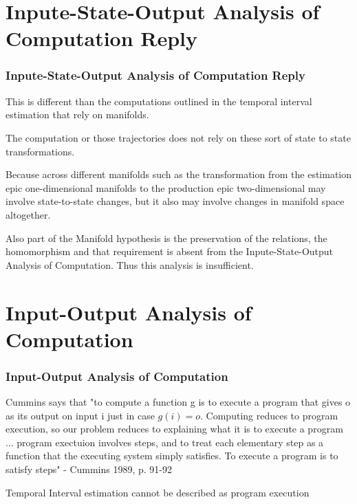\documentclass{beamer}
\begin{document}
\section{Inpute-State-Output Analysis of Computation Reply}
\begin{frame}
\frametitle{\textbf{Inpute-State-Output Analysis of Computation Reply} }

This is different than the computations outlined in the temporal interval estimation that rely on manifolds.

The computation or those trajectories does not rely on these sort of state to state transformations.

Because across different manifolds such as the transformation from the estimation epic one-dimensional manifolds to the production epic two-dimensional may involve state-to-state changes, but it also may involve changes in manifold space altogether.

Also part of the Manifold hypothesis is the preservation of the relations, the homomorphism and that requirement is absent from the Inpute-State-Output Analysis of Computation. Thus this analysis is insufficient.

\end{frame}


\section{Input-Output Analysis of Computation}
\begin{frame}
\frametitle{\textbf{Input-Output Analysis of Computation} }

Cummins says that "to compute a function g is to execute a program that gives o as its output on input i just in case $g(i) = o$. Computing reduces to program execution, so our problem reduces to explaining what it is to execute a program ... program exectuion involves steps, and to treat each elementary step as a function that the executing system simply satisfies. To execute a program is to satisfy steps" - Cummins 1989, p. 91-92


Temporal Interval estimation cannot be described as program execution 

\end{frame}
\end{document}

